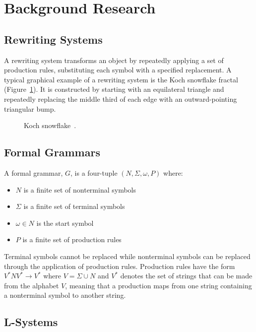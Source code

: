 \section{Background Research}

\subsection{Rewriting Systems}

A rewriting system transforms an object by repeatedly applying a set of production rules, substituting each
symbol with a specified replacement. A typical graphical example of a rewriting system is the Koch snowflake
fractal (Figure~\ref{fig:kochflake}). It is constructed by starting with an equilateral triangle and
repeatedly replacing the middle third of each edge with an outward-pointing triangular bump.

\begin{figure}[h]
  \centering
  \def\svgwidth{0.5\textwidth}
  
  \caption{Koch snowflake~\cite{commonsSVGVersionKochFlakepng}.}
  \label{fig:kochflake}
\end{figure}

\subsection{Formal Grammars}

A formal grammar, $G$, is a four-tuple $(N, \Sigma, \omega, P)$ where:
\begin{itemize}
  \item $N$ is a finite set of nonterminal symbols
  \item $\Sigma$ is a finite set of terminal symbols
  \item $\omega \in N$ is the start symbol
  \item $P$ is a finite set of production rules
\end{itemize}

Terminal symbols cannot be replaced while nonterminal symbols can be replaced through the application of
production rules. Production rules have the form $V^* N V^* \rightarrow V^*$ where $V = \Sigma \cup N$ and
$V^*$ denotes the set of strings that can be made from the alphabet $V$, meaning that a production maps from
one string containing a nonterminal symbol to another string.

\subsection{L-Systems}

